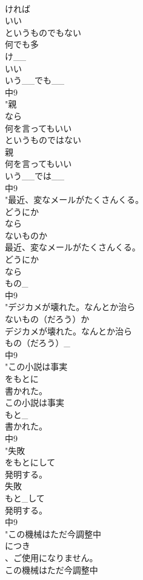 \documentclass[8pt]{extreport}
\begin{document}
\begin{CJK}{UTF8}{min}
\\	ければ
\\	いい
\\	というものでもない
\\	何でも多
\\	け__
\\	いい
\\	いう__でも__
\\	中9
\\	"親
\\	なら
\\	何を言ってもいい
\\	というものではない
\\	親
\\	何を言ってもいい
\\	いう__では__
\\	中9
\\	"最近、変なメールがたくさんくる。
\\	どうにか
\\	なら
\\	ないものか
\\	最近、変なメールがたくさんくる。
\\	どうにか
\\	なら
\\	もの_
\\	中9
\\	"デジカメが壊れた。なんとか治ら
\\	ないもの（だろう）か
\\	デジカメが壊れた。なんとか治ら
\\	もの（だろう）_
\\	中9
\\	"この小説は事実
\\	をもとに
\\	書かれた。
\\	この小説は事実
\\	もと_
\\	書かれた。
\\	中9
\\	"失敗
\\	をもとにして
\\	発明する。
\\	失敗
\\	もと_して
\\	発明する。
\\	中9
\\	"この機械はただ今調整中
\\	につき
\\	、ご使用になりません。
\\	この機械はただ今調整中

\end{CJK}
\end{document}
